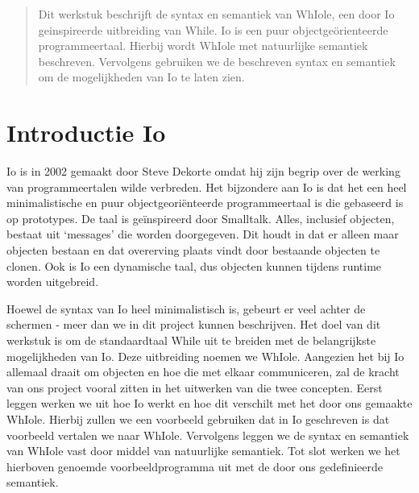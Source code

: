 \documentclass[12pt]{article}
\begin{document}
\maketitle

\begin{abstract}
Dit werkstuk beschrijft de syntax en semantiek van WhIole, een door Io geinspireerde uitbreiding van While. Io is een puur objectge\"orienteerde programmeertaal. Hierbij wordt WhIole met natuurlijke semantiek beschreven. Vervolgens gebruiken we de beschreven syntax en semantiek om
de mogelijkheden van Io te laten zien.
\end{abstract}

\section{Introductie Io}
Io is in 2002 gemaakt door Steve Dekorte omdat hij zijn begrip over de werking van programmeertalen wilde verbreden.
Het bijzondere aan Io is dat het een heel minimalistische en puur objectgeoriënteerde programmeertaal is die gebaseerd is op prototypes. De taal is geïnspireerd door Smalltalk. Alles, inclusief objecten, bestaat uit `messages' die worden doorgegeven.
Dit houdt in dat er alleen maar objecten bestaan en dat overerving plaats vindt door bestaande objecten te clonen.
Ook is Io een dynamische taal, dus objecten kunnen tijdens runtime worden uitgebreid.

Hoewel de syntax van Io heel minimalistisch is, gebeurt er veel achter de schermen - meer dan we in dit project kunnen beschrijven.
Het doel van dit werkstuk is om de standaardtaal While uit te breiden met de belangrijkste mogelijkheden van Io.
Deze uitbreiding noemen we WhIole.
Aangezien het bij Io allemaal draait om objecten en hoe die met elkaar communiceren, zal de kracht van ons project vooral zitten in het uitwerken van die twee concepten.
Eerst leggen werken we uit hoe Io werkt en hoe dit verschilt met het door ons gemaakte WhIole. Hierbij zullen we een voorbeeld gebruiken dat in Io geschreven is dat voorbeeld vertalen we naar WhIole. Vervolgens leggen we de syntax en semantiek van WhIole vast door middel van natuurlijke semantiek. Tot slot werken we het hierboven genoemde voorbeeldprogramma uit met de door ons gedefinieerde semantiek. 
\end{document}
